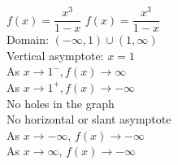 {$f(x) = \dfrac{x^3}{1-x}$}
{$f(x) = \dfrac{x^3}{1-x}$\\
Domain: $(-\infty, 1) \cup (1, \infty)$\\
Vertical asymptote: $x=1$\\
As $x \rightarrow 1^{-}, f(x) \rightarrow \infty$\\
As $x \rightarrow 1^{+}, f(x) \rightarrow -\infty$\\
No holes in the graph \\
No horizontal or slant asymptote \\
As $x \rightarrow -\infty$, $f(x) \rightarrow -\infty$\\
As $x \rightarrow \infty$, $f(x) \rightarrow -\infty$}